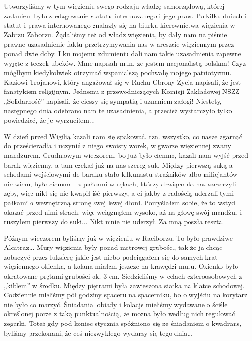 Utworzyliśmy w tym więzieniu swego rodzaju władzę samorządową, której zadaniem było zredagowanie statutu internowanego i jego praw. Po kilku dniach i statut i prawa internowanego znalazły się na biurku kierownictwa więzienia w Zabrzu Zaborzu. Żądaliśmy też od władz więzienia, by dały nam na piśmie prawne uzasadnienie faktu przetrzymywania nas w areszcie więziennym przez ponad dwie doby. I ku mojemu zdumieniu dali nam takie uzasadnienia zapewne wyjęte z teczek ubeków. Mnie napisali m.in. że jestem nacjonalistą polskim! Czyż mógłbym kiedykolwiek otrzymać wspanialszą pochwałę mojego patriotyzmu. Kaziowi Trojanowi, który angażował się w Ruchu Obrony Życia napisali, że jest fanatykiem religijnym. Jednemu z przewodniczących Komisji Zakładowej NSZZ „Solidarność” napisali, że cieszy się sympatią i uznaniem załogi! Niestety, następnego dnia odebrano nam te uzasadnienia, a przecież wystarczyło tylko powiedzieć, że je wyrzuciłem...

W dzień przed Wigilią kazali nam się spakować, tzn. wszystko, co nasze zgarnąć do prześcieradła i uczynić z niego swoisty worek, w gwarze więziennej zwany mandżurem. Grudniowym wieczorem, bo już było ciemno, kazali nam wyjść przed barak więzienny, a tam czekał już na nas szereg suk. Między pierwszą suką a schodami wejściowymi do baraku stało kilkunastu strażników albo milicjantów – nie wiem, było ciemno – z pałkami w rękach, którzy drwiąco do nas szczerzyli zęby, więc nikt się nie kwapił iść pierwszy, a ci jakby z radością uderzali tymi pałkami o wewnętrzną stronę swej lewej dłoni. Pomyślałem sobie, że to wstyd okazać przed nimi strach, więc wciągnąłem wysoko, aż na głowę swój mandżur i ruszyłem pierwszy do suki... Nikt mnie nie uderzył. Za mną poszła reszta. 

Późnym wieczorem byliśmy już w więzieniu w Raciborzu. To było prawdziwe Alcatraz... Mury więzienia były ponad metrowej grubości, tak że ja chcąc zobaczyć przez luksferę  jakie jest niebo podciągałem się do samych krat więziennego okienka, a kolana miałem jeszcze na krawędzi muru. Okienko było okratowane prętami grubości ok. 3 cm. Siedzieliśmy w celach czteroosobowych z „kiblem” w środku. Między piętrami była zawieszona siatka na klatce schodowej. Codziennie mieliśmy pół godziny spaceru na spacerniku, bo o wyjściu na korytarz nie było co marzyć. Śniadania, obiady i kolacje mieliśmy wydawane o ściśle określonej porze z taką punktualnością, że można było według nich regulować zegarki. Toteż gdy pod koniec stycznia spóźniono się ze śniadaniem o kwadrans, byliśmy przekonani, że coś niezwykłego wydarzy się tego dnia...

